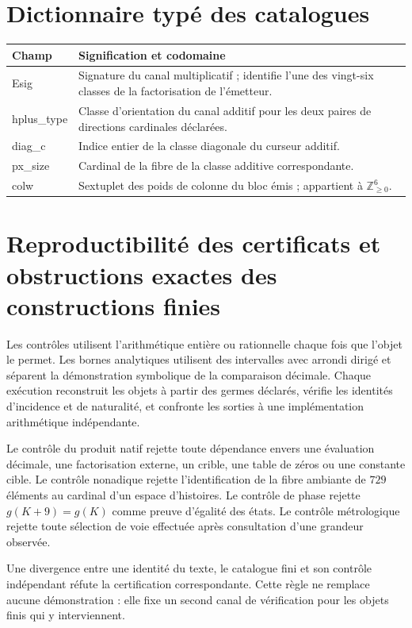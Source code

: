\section{Dictionnaire typé des catalogues}

\begin{longtable}{>{\ttfamily}p{}>{\raggedright\arraybackslash}p{}}
\toprule
Champ & Signification et codomaine\\
\midrule
\endhead
Esig & Signature du canal multiplicatif ; identifie l'une des vingt-six
classes de la factorisation de l'émetteur.\\
hplus\_type & Classe d'orientation du canal additif pour les deux paires de
directions cardinales déclarées.\\
diag\_c & Indice entier de la classe diagonale du curseur additif.\\
px\_size & Cardinal de la fibre de la classe additive correspondante.\\
colw & Sextuplet des poids de colonne du bloc émis ; appartient à
\(\mathbb Z_{\geq0}^{6}\).\\
\bottomrule
\end{longtable}

\section{Reproductibilité des certificats et obstructions exactes des constructions finies}

Les contrôles utilisent l'arithmétique entière ou rationnelle chaque fois que l'objet le
permet. Les bornes analytiques utilisent des intervalles avec arrondi dirigé et séparent
la démonstration symbolique de la comparaison décimale. Chaque exécution
reconstruit les objets à partir des germes déclarés, vérifie les identités
d'incidence et de naturalité, et confronte les sorties à une implémentation
arithmétique indépendante.

Le contrôle du produit natif rejette toute dépendance envers une évaluation
décimale, une factorisation externe, un crible, une table de zéros ou une
constante cible. Le contrôle nonadique rejette l'identification de la fibre
ambiante de \(729\) éléments au cardinal d'un espace d'histoires. Le
contrôle de phase rejette \(g(K+9)=g(K)\) comme preuve d'égalité des états. Le
contrôle métrologique rejette toute sélection de voie effectuée après
consultation d'une grandeur observée.

Une divergence entre une identité du texte, le catalogue fini et son contrôle
indépendant réfute la certification correspondante. Cette règle ne remplace
aucune démonstration : elle fixe un second canal de vérification pour les objets
finis qui y interviennent.
